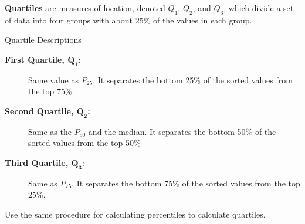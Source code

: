 \documentclass{beamer}
\begin{document}
\begin{frame}
\begin{definition}
\textbf{Quartiles} are measures of location, denoted $Q_1$, $Q_2$, and $Q_3$, which divide a set of data into four groups with about 25\% of the values in each group.
\end{definition}\pause

\begin{block}{Quartile Descriptions}
\begin{description}
\item[\textbf{First Quartile, $\boldsymbol{Q_1}$:}] Same value as $P_{25}$. It separates the bottom 25\% of the sorted values from the top 75\%.\pause
\item[\textbf{Second Quartile, $\boldsymbol{Q_2}$:}] Same as the $P_{50}$ and the median. It separates the bottom 50\% of the sorted values from the top 50\%\pause
\item[\textbf{Third Quartile, $\boldsymbol{Q_3}$}:] Same as $P_{75}$. It separates the bottom 75\% of the sorted values from the top 25\%.
\end{description}
\end{block}\pause

\begin{note}
Use the same procedure for calculating percentiles to calculate quartiles.
\end{note}
\end{frame}
\end{document}
